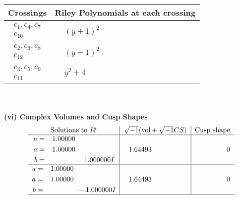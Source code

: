 \documentclass[1p]{elsarticle_modified}
\theoremstyle{definition}
\newcommand{\I}{\sqrt{-1}}
\begin{document}
\begin{tabular}{m{50pt}|m{274pt}}
Crossings & \hspace{64pt}Riley Polynomials at each crossing \\
\hline $$\begin{aligned}c_{1},c_{4},c_{7}\\c_{10}\end{aligned}$$&$\begin{aligned}
&(y+1)^2
\end{aligned}$\\
\hline $$\begin{aligned}c_{2},c_{6},c_{8}\\c_{12}\end{aligned}$$&$\begin{aligned}
&(y-1)^2
\end{aligned}$\\
\hline $$\begin{aligned}c_{3},c_{5},c_{9}\\c_{11}\end{aligned}$$&$\begin{aligned}
&y^2+4
\end{aligned}$\\
\hline
\end{tabular}\\~\\
\newpage\flushleft \textbf{(vi) Complex Volumes and Cusp Shapes}
$$\begin{array}{c|c|c}  
\text{Solutions to }I^u_{7}& \I (\text{vol} + \sqrt{-1}CS) & \text{Cusp shape}\\
 \hline 
\begin{aligned}
u &= \phantom{-}1.00000\phantom{ +0.000000I} \\
a &= \phantom{-}1.00000\phantom{ +0.000000I} \\
b &= \phantom{-0.000000 -}1.000000 I\end{aligned}
 & \phantom{-}1.64493\phantom{ +0.000000I} & \phantom{-0.000000 } 0 \\ \hline\begin{aligned}
u &= \phantom{-}1.00000\phantom{ +0.000000I} \\
a &= \phantom{-}1.00000\phantom{ +0.000000I} \\
b &= \phantom{-0.000000 } -1.000000 I\end{aligned}
 & \phantom{-}1.64493\phantom{ +0.000000I} & \phantom{-0.000000 } 0\\
 \hline 
 \end{array}$$\newpage\newpage\renewcommand{\arraystretch}{1}
\end{document}
